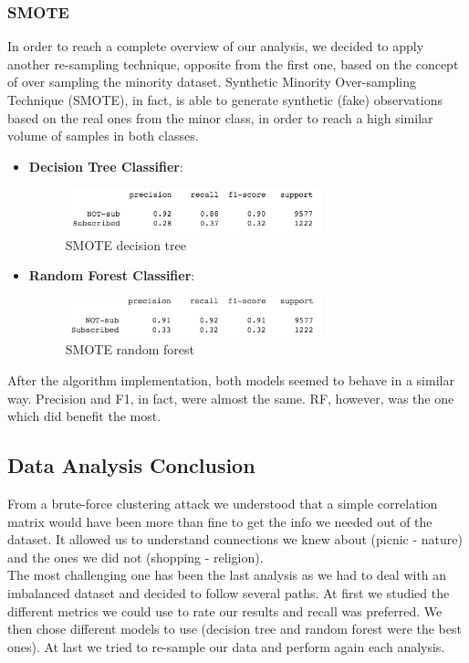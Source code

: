 \clearpage
\subsubsection{SMOTE}
In order to reach a complete overview of our analysis, we decided to apply another re-sampling technique, opposite from the first one, based on the concept of over sampling the minority dataset. Synthetic Minority Over-sampling Technique (SMOTE), in fact, is able to generate synthetic (fake) observations based on the real ones from the minor class, in order to reach a high similar volume of samples in both classes.

\begin{itemize}
\item \textbf{Decision Tree Classifier}: 

\begin{figure}[H]
\centering
\includegraphics[width=0.7\textwidth]{Img/smote_tree.png}
\caption{SMOTE decision tree}
\end{figure}
\item \textbf{Random Forest Classifier}: 

\begin{figure}[H]
\centering
\includegraphics[width=0.7\textwidth]{Img/smote_forest.png}
\caption{SMOTE random forest}
\end{figure}
\end{itemize}

\noindent After the algorithm implementation, both models seemed to behave in a similar way. Precision and F1, in fact, were almost the same. RF, however, was the one which did benefit the most.
\clearpage
\subsection{Data Analysis Conclusion}
From a brute-force clustering attack we understood that a simple correlation matrix would have been more than fine to get the info we needed out of the dataset. It allowed us to understand connections we knew about (picnic - nature) and the ones we did not (shopping - religion).\\
The most challenging one has been the last analysis as we had to deal with an imbalanced dataset and decided to follow several paths. At first we studied the different metrics we could use to rate our results and recall was preferred. We then chose different models to use (decision tree and random forest were the best ones). At last we tried to re-sample our data and perform again each analysis.

